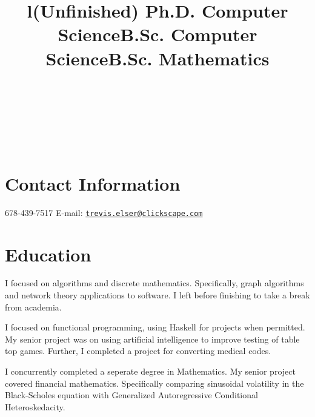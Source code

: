 \documentclass[margintitle,line]{res}
\begin{document}

\begin{resume}

\begin{format}
\\
\title{l}\\
\body\\
\end{format}

\section{Contact Information}

678-439-7517 \hfill {E-mail:} \href{mailto:trevis.elser@clickscape.com}{\nolinkurl{trevis.elser@clickscape.com}} \\

\section{Education}

\title{(Unfinished) Ph.D. Computer Science}
\begin{position}
I focused on algorithms and discrete mathematics. Specifically, graph algorithms and network theory applications to software. I left before finishing to take a break from academia.
\end{position}

\title{B.Sc. Computer Science}
\begin{position}
I focused on functional programming, using Haskell for projects when permitted. My senior project was on using artificial intelligence to improve testing of table top games. Further, I completed a project for converting medical codes.
\end{position}

\title{B.Sc. Mathematics}
\begin{position}
I concurrently completed a seperate degree in Mathematics. My senior project covered financial mathematics. Specifically comparing sinusoidal volatility in the Black-Scholes equation with Generalized Autoregressive Conditional Heteroskedacity.
\end{position}


\end{resume}
\end{document}
